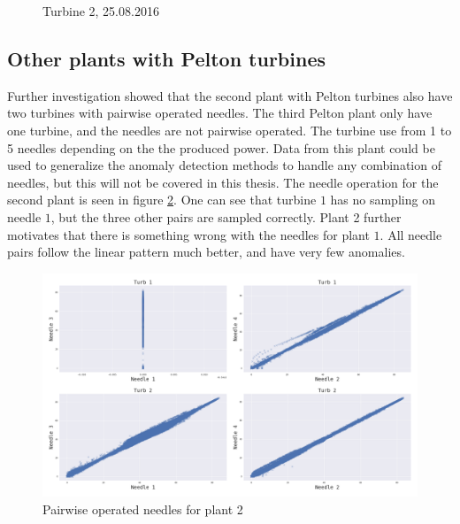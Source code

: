 \begin{figure}[h!]
\begin{minipage}[b]{0.5\linewidth}
                \caption{Turbine 2, 25.08.2016}
                \label{fig:start_failure_turb2}
            \end{minipage}
        \end{figure}
        
        
    
    \subsection{Other plants with Pelton turbines}
        Further investigation showed that the second plant with Pelton turbines also have two turbines with pairwise operated needles. The third Pelton plant only have one turbine, and the needles are not pairwise operated. The turbine use from 1 to 5 needles depending on the the produced power. Data from this plant could be used to generalize the anomaly detection methods to handle any combination of needles, but this will not be covered in this thesis. The needle operation for the second plant is seen in figure \ref{fig:plant2_needles}. One can see that turbine $1$ has no sampling on needle $1$, but the three other pairs are sampled correctly. Plant 2 further motivates that there is something wrong with the needles for plant $1$. All needle pairs follow the linear pattern much better, and have very few anomalies.
        \begin{figure}
            \centering
            \includegraphics[width=\textwidth]{report/figures/data/plant_2_needle_plot.png}
            \caption{Pairwise operated needles for plant 2}
            \label{fig:plant2_needles}
        \end{figure}
        
        
        
        
